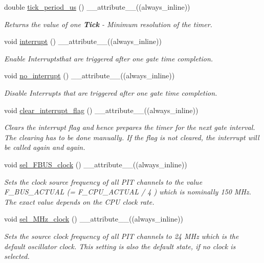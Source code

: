 \begin{DoxyCompactItemize}
double \hyperlink{classPITController_a2b64ce8a01dc1254002c4ff3c384a6fd}{tick\+\_\+period\+\_\+us} () \+\_\+\+\_\+attribute\+\_\+\+\_\+((always\+\_\+inline))
\begin{DoxyCompactList}\small\item\em Returns the value of one {\bfseries Tick} -\/ Minimum resolution of the timer. \end{DoxyCompactList}\item 
void \hyperlink{classPITController_af1a21e0b3f9a57e247aa40c457e15ee3}{interrupt} () \+\_\+\+\_\+attribute\+\_\+\+\_\+((always\+\_\+inline))
\begin{DoxyCompactList}\small\item\em Enable Interruptsthat are triggered after one gate time completion. \end{DoxyCompactList}\item 
void \hyperlink{classPITController_a6e36c84f319e52e5a14ca20f299b64b5}{no\+\_\+interrupt} () \+\_\+\+\_\+attribute\+\_\+\+\_\+((always\+\_\+inline))
\begin{DoxyCompactList}\small\item\em Disable Interrupts that are triggered after one gate time completion. \end{DoxyCompactList}\item 
void \hyperlink{classPITController_ae3f9c981e88cced34153234475de5646}{clear\+\_\+interrupt\+\_\+flag} () \+\_\+\+\_\+attribute\+\_\+\+\_\+((always\+\_\+inline))
\begin{DoxyCompactList}\small\item\em Clears the interrupt flag and hence prepares the timer for the next gate interval. The clearing has to be done manually. If the flag is not cleared, the interrupt will be called again and again. \end{DoxyCompactList}\item 
void \hyperlink{classPITController_a63e67e2ebfd6ceb5f5e38d9bd6a54754}{sel\+\_\+\+F\+B\+U\+S\+\_\+clock} () \+\_\+\+\_\+attribute\+\_\+\+\_\+((always\+\_\+inline))
\begin{DoxyCompactList}\small\item\em Sets the clock source frequency of all P\+IT channels to the value F\+\_\+\+B\+U\+S\+\_\+\+A\+C\+T\+U\+AL (= F\+\_\+\+C\+P\+U\+\_\+\+A\+C\+T\+U\+AL / 4 ) which is nominally 150 M\+Hz. The exact value depends on the C\+PU clock rate. \end{DoxyCompactList}\item 
void \hyperlink{classPITController_adb0d04fa23f4ebd20d2f495a86af3ccd}{sel\+\_\+M\+Hz\+\_\+clock} () \+\_\+\+\_\+attribute\+\_\+\+\_\+((always\+\_\+inline))
\begin{DoxyCompactList}\small\item\em Sets the source clock frequency of all P\+IT channels to 24 M\+Hz which is the default oscillator clock. This setting is also the default state, if no clock is selected. \end{DoxyCompactList}\end{DoxyCompactItemize}
